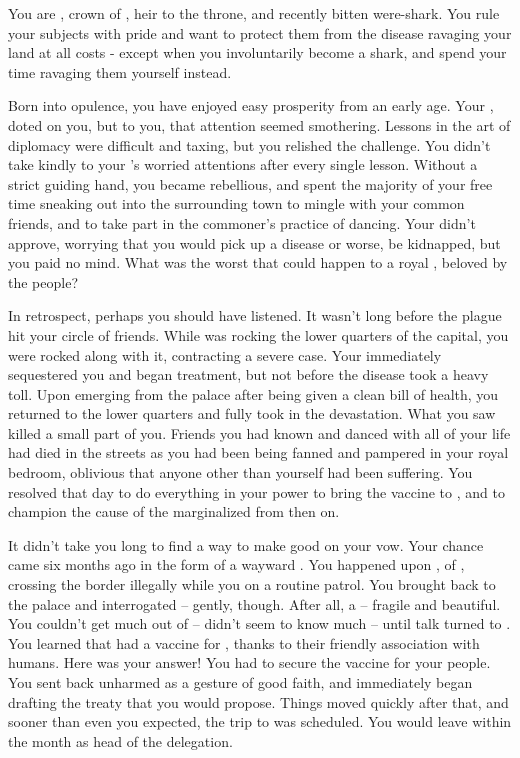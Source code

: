 \documentclass[char]{NeptuneBall}
\begin{document}
\name{\cPrince{}}

You are \cPrince{}, crown \cPrince{\prince} of \pPacifica{}, heir to the throne, and recently bitten were-shark. You rule your subjects with pride and want to protect them from the disease ravaging your land at all costs - except when you involuntarily become a shark, and spend your time ravaging them yourself instead.

Born into opulence, you have enjoyed easy prosperity from an early age. Your \cPacificanRuler{\parent}, \cPacificanRuler{\King} \cPacificanRuler{} doted on you, but to you, that attention seemed smothering. Lessons in the art of diplomacy were difficult and taxing, but you relished the challenge. You didn't take kindly to your \cPacificanRuler{\parent}'s worried attentions after every single lesson. Without a strict guiding hand, you became rebellious, and spent the majority of your free time sneaking out into the surrounding town to mingle with your common friends, and to take part in the commoner's practice of dancing. Your \cPacificanRuler{\parent} didn't approve, worrying that you would pick up a disease or worse, be kidnapped, but you paid \cPacificanRuler{\them} no mind. What was the worst that could happen to a royal \cPrince{\prince}, beloved by the people?

In retrospect, perhaps you should have listened. It wasn't long before the plague hit your circle of friends. While \ppolio{} was rocking the lower quarters of the capital, you were rocked along with it, contracting a severe case. Your \cPacificanRuler{\parent} immediately sequestered you and began treatment, but not before the disease took a heavy toll. Upon emerging from the palace after being given a clean bill of health, you returned to the lower quarters and fully took in the devastation. What you saw killed a small part of you. Friends you had known and danced with all of your life had died in the streets as you had been being fanned and pampered in your royal bedroom, oblivious that anyone other than yourself had been suffering. You resolved that day to do everything in your power to bring the vaccine to \pPacifica{}, and to champion the cause of the marginalized from then on.

It didn't take you long to find a way to make good on your vow. Your chance came six months ago in the form of a wayward \cPrincess{\waif}. You happened upon \cPrincess{}, \cPrincess{\prince} of \pAtlantis{}, crossing the border illegally while you on a routine patrol. You brought \cPrincess{\them} back to the palace and interrogated \cPrincess{\them} -- gently, though. After all, \cPrincess{\they} \cPrincess{\were} a \cPrincess{\prince} -- fragile and beautiful. You couldn't get much out of \cPrincess{\them} -- \cPrincess{\they} didn't seem to know much -- until talk turned to \ppolio{}. You learned that \pAtlantis{} had a vaccine for \ppolio{}, thanks to their friendly association with humans. Here was your answer! You had to secure the vaccine for your people.  You sent \cPrincess{} back unharmed as a gesture of good faith, and immediately began drafting the treaty that you would propose. Things moved quickly after that, and sooner than even you expected, the trip to \pAtlantis{} was scheduled. You would leave within the month as head of the delegation.
\end{document}
